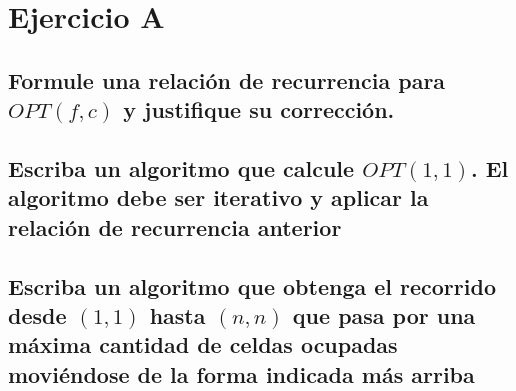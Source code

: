 \section{Ejercicio A}

\subsection{ Formule una relación de recurrencia para $OPT(f, c)$ y justifique su corrección.}



\subsection{Escriba un algoritmo que calcule $OPT(1, 1)$. El algoritmo debe ser iterativo y
	aplicar la relación de recurrencia anterior}




\subsection{Escriba un algoritmo que obtenga el recorrido desde $(1, 1)$ hasta $(n, n)$
	que pasa por una máxima cantidad de celdas ocupadas moviéndose de la forma indicada más arriba}







\newpage